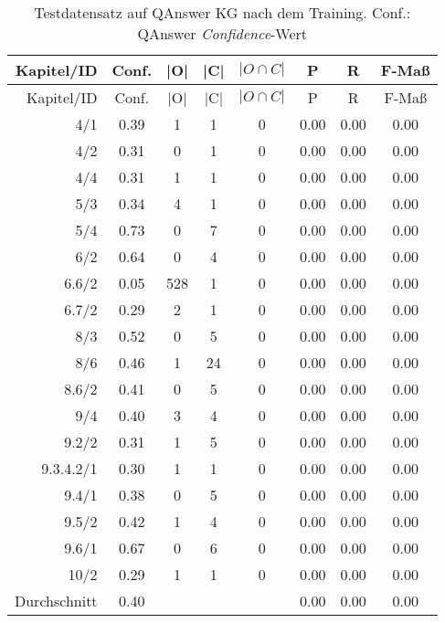 \begin{longtable}{r c c c c c c c}
  \caption[Testdatensatz QAnswer nach Training]{Testdatensatz auf QAnswer KG nach dem Training.
  Conf.: QAnswer \emph{Confidence}-Wert}
  \label{tab:qanswernachtraining}
  \\
  \toprule
  Kapitel/ID    & Conf. & |O|   & |C|   & $|O \cap C|$  & P     & R     & F-Maß   \\
  \midrule
  \endfirsthead
  \toprule
  Kapitel/ID    & Conf. & |O|   & |C|   & $|O \cap C|$  & P     & R     & F-Maß   \\
  \midrule
  \endhead
	4/1			& 0.39 & 1 & 1 & 0 & 0.00 & 0.00 & 0.00 \\
	4/2			& 0.31 & 0 & 1 & 0 & 0.00 & 0.00 & 0.00 \\
	4/4			& 0.31 & 1 & 1 & 0 & 0.00 & 0.00 & 0.00 \\
	5/3			& 0.34 & 4 & 1 & 0 & 0.00 & 0.00 & 0.00 \\
	5/4			& 0.73 & 0 & 7 & 0 & 0.00 & 0.00 & 0.00 \\
	6/2			& 0.64 & 0 & 4 & 0 & 0.00 & 0.00 & 0.00 \\
	6.6/2		& 0.05 & 528 & 1 & 0 & 0.00 & 0.00 & 0.00 \\
	6.7/2		& 0.29 & 2 & 1 & 0 & 0.00 & 0.00 & 0.00 \\
	8/3			& 0.52 & 0 & 5 & 0 & 0.00 & 0.00 & 0.00 \\
	8/6			& 0.46 & 1 & 24 & 0 & 0.00 & 0.00 & 0.00 \\
	8.6/2		& 0.41 & 0 & 5 & 0 & 0.00 & 0.00 & 0.00 \\
	9/4			& 0.40 & 3 & 4 & 0 & 0.00 & 0.00 & 0.00 \\
	9.2/2		& 0.31 & 1 & 5 & 0 & 0.00 & 0.00 & 0.00 \\
	9.3.4.2/1	& 0.30 & 1 & 1 & 0 & 0.00 & 0.00 & 0.00 \\
	9.4/1		& 0.38 & 0 & 5 & 0 & 0.00 & 0.00 & 0.00 \\
	9.5/2		& 0.42 & 1 & 4 & 0 & 0.00 & 0.00 & 0.00 \\
	9.6/1		& 0.67 & 0 & 6 & 0 & 0.00 & 0.00 & 0.00 \\
	10/2		& 0.29 & 1 & 1 & 0 & 0.00 & 0.00 & 0.00 \\
  \midrule
  Durchschnitt  & 0.40 &  &  &   & 0.00 & 0.00 & 0.00 \\
  \bottomrule
\end{longtable}

